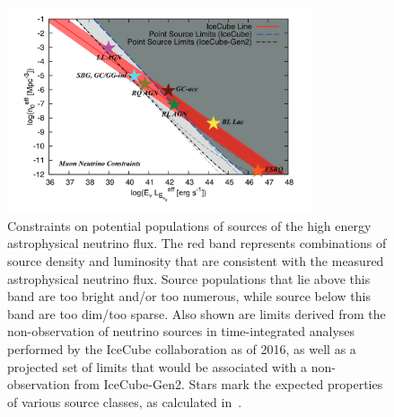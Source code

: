\begin{figure}[h]
\centering
\includegraphics[width=0.8\textwidth]{figs/muraseplot.png}
\caption{Constraints on potential populations of sources of the high energy astrophysical neutrino flux. The red band represents combinations of source density and luminosity that are consistent with the measured astrophysical neutrino flux. Source populations that lie above this band are too bright and/or too numerous, while source below this band are too dim/too sparse. Also shown are limits derived from the non-observation of neutrino sources in time-integrated analyses performed by the IceCube collaboration as of 2016, as well as a projected set of limits that would be associated with a non-observation from IceCube-Gen2. Stars mark the expected properties of various source classes, as calculated in~\cite{Murase_constraints}. }
\label{fig:muraseplot}
\end{figure}

